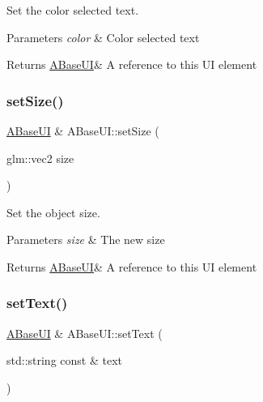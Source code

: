 Set the color selected text. 


\begin{DoxyParams}{Parameters}
{\em color} & Color selected text \\
\hline
\end{DoxyParams}
\begin{DoxyReturn}{Returns}
\hyperlink{class_a_base_u_i}{A\+Base\+UI}\& A reference to this UI element 
\end{DoxyReturn}
\mbox{\label{class_a_base_u_i_ae50c31f566ad854411d09f75c2190c12}} 
\subsubsection{\texorpdfstring{set\+Size()}{setSize()}}
{\footnotesize\ttfamily \hyperlink{class_a_base_u_i}{A\+Base\+UI} \& A\+Base\+U\+I\+::set\+Size (\begin{DoxyParamCaption}\item[{glm\+::vec2}]{size }\end{DoxyParamCaption})\hspace{0.3cm}{\ttfamily [virtual]}}



Set the object size. 


\begin{DoxyParams}{Parameters}
{\em size} & The new size \\
\hline
\end{DoxyParams}
\begin{DoxyReturn}{Returns}
\hyperlink{class_a_base_u_i}{A\+Base\+UI}\& A reference to this UI element 
\end{DoxyReturn}
\mbox{\label{class_a_base_u_i_a82e182bfd577d37224aa49be3f64ac87}} 
\subsubsection{\texorpdfstring{set\+Text()}{setText()}}
{\footnotesize\ttfamily \hyperlink{class_a_base_u_i}{A\+Base\+UI} \& A\+Base\+U\+I\+::set\+Text (\begin{DoxyParamCaption}\item[{std\+::string const \&}]{text }\end{DoxyParamCaption})\hspace{0.3cm}{\ttfamily [virtual]}}



